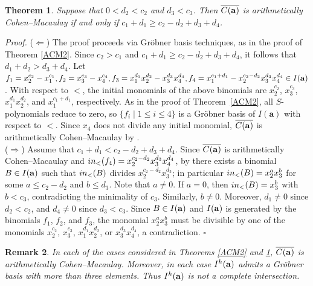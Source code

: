 \documentclass[10pt,a4paper]{amsart}
\newtheorem{thm1}{Theorem}[section]
\newtheorem{rem1}[thm1]{Remark}
\begin{document}
\begin{thm1} \label{ACM3} Suppose that $0<d_2<c_2$ and $d_{3}<c_{3}$. Then $\overline{C({\bf a})}$ is arithmetically Cohen--Macaulay if and only if $c_{1}+d_{1} \geq c_{2}-d_{2}+d_{3}+d_{4}$.
\end{thm1}

{\em \noindent Proof.} ($\Leftarrow$) The proof proceeds via Gr\"obner basis techniques, as in the proof of Theorem \ref{ACM2}. Since $c_2 > c_1$ and $c_1 + d_1 \geq c_2 - d_2 + d_3 + d_4$, it follows that $d_1 + d_2 > d_3 + d_4$. Let $f_1=x_2^{c_2}-x_1^{c_1}, f_2=x_3^{c_3}-x_4^{c_4}, f_3=x_1^{d_1}x_2^{d_2}-x_3^{d_3}x_4^{d_4}, f_4=x_1^{c_1+d_{1}}-x_2^{c_{2}-d_2}x_3^{d_3}x_4^{d_4} \in I({\bf a})$. With respect to $<$, the initial monomials of the above binomials are $x_2^{c_2}$, $x_3^{c_3}$, $x_1^{d_1}x_2^{d_2}$, and $x_1^{c_1+d_{1}}$, respectively. As in the proof of Theorem~\ref{ACM2}, all $S$-polynomials reduce to zero, so $\{f_i \mid 1 \leq i \leq 4\}$ is a Gr\"obner basis of $I(\mathbf a)$ with respect to $<$. Since $x_4$ does not divide any initial monomial, $\overline{C({\bf a})}$ is arithmetically Cohen--Macaulay by \cite[Theorem 2.2]{HerSta}.\\
($\Rightarrow$) Assume that $c_{1}+d_{1}<c_{2}-d_{2}+d_{3}+d_{4}$. Since $\overline{C({\bf a})}$ is arithmetically Cohen--Macaulay and ${\rm in}_{<}(f_4)=x_2^{c_{2}-d_2}x_3^{d_3}x_4^{d_4}$, by \cite[Theorem 2.2]{HerSta} there exists a binomial $B \in I({\bf a})$ such that ${\rm in}_{<}(B)$ divides $x_2^{c_{2}-d_2}x_3^{d_3}$; in particular ${\rm in}_{<}(B)=x_2^{a}x_3^{b}$ for some $a \leq c_{2}-d_{2}$ and $b \leq d_{3}$. Note that $a \neq 0$. If $a = 0$, then ${\rm in}_{<}(B)= x_3^b$ with $b < c_3$, contradicting the minimality of $c_3$. Similarly, $b \neq 0$. Moreover, $d_1 \neq 0$ since $d_2 < c_2$, and $d_4 \neq 0$ since $d_3<c_3$. Since $B \in I({\bf a})$ and $I({\bf a})$ is generated by the binomials $f_1$, $f_2$, and $f_3$, the monomial $x_2^{a}x_3^{b}$ must be divisible by one of the monomials $x_2^{c_2}$, $x_3^{c_3}$, $x_1^{d_1}x_2^{d_2}$, or $x_3^{d_3}x_4^{d_4}$, a contradiction. \hfill $\square$

\begin{rem1} {\rm In each of the cases considered in Theorems \ref{ACM2} and \ref{ACM3}, $\overline{C({\bf a})}$ is arithmetically Cohen--Macaulay. Moreover, in each case $I^{h}({\bf a})$ admits a Gr\"obner basis with more than three elements. Thus $I^{h}({\bf a})$ is not a complete intersection.}
\end{rem1}
\end{document}
